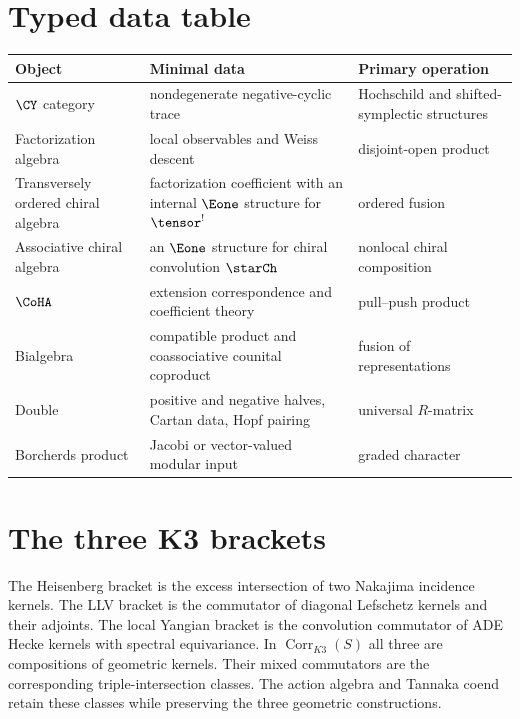 \chapter{Typed data table}
\begin{center}
\small
\begin{tabularx}{0.98\textwidth}{@{}>{\raggedright\arraybackslash}p{}>{\raggedright\arraybackslash}X>{\raggedright\arraybackslash}p{}@{}}
\toprule
\textbf{Object}&\textbf{Minimal data}&\textbf{Primary operation}\\
\midrule
$\CY$ category&nondegenerate negative-cyclic trace&Hochschild and shifted-symplectic structures\\
Factorization algebra&local observables and Weiss descent&disjoint-open product\\
Transversely ordered chiral algebra&factorization coefficient with an internal $\Eone$ structure for $\tensor^!$&ordered fusion\\
Associative chiral algebra&an $\Eone$ structure for chiral convolution $\starCh$&nonlocal chiral composition\\
$\CoHA$&extension correspondence and coefficient theory&pull--push product\\
Bialgebra&compatible product and coassociative counital coproduct&fusion of representations\\
Double&positive and negative halves, Cartan data, Hopf pairing&universal $R$-matrix\\
Borcherds product&Jacobi or vector-valued modular input&graded character\\
\bottomrule
\end{tabularx}
\end{center}

\chapter{The three K3 brackets}
The Heisenberg bracket is the excess intersection of two Nakajima incidence kernels.  The LLV bracket is the commutator of diagonal Lefschetz kernels and their adjoints.  The local Yangian bracket is the convolution commutator of ADE Hecke kernels with spectral equivariance.  In $\operatorname{Corr}_{K3}(S)$ all three are compositions of geometric kernels.  Their mixed commutators are the corresponding triple-intersection classes.  The action algebra and Tannaka coend retain these classes while preserving the three geometric constructions.

